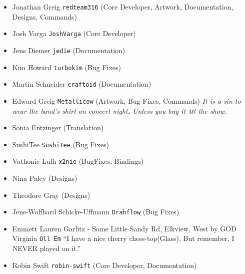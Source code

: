 \begin{itemize}
\item Jonathan Greig \texttt{redteam316} (Core Developer, Artwork, Documentation, Designs, Commands)
\item Josh Varga \texttt{JoshVarga} (Core Developer)
\item Jens Diemer \texttt{jedie} (Documentation)
\item Kim Howard \texttt{turbokim} (Bug Fixes)
\item Martin Schneider \texttt{craftoid} (Documentation)
\item Edward Greig \texttt{Metallicow} (Artwork, Bug Fixes, Commands)
    \emph{It is a sin to wear the band's shirt on concert night, Unless you buy it @t the show.}
\item Sonia Entzinger (Translation)
\item SushiTee \texttt{SushiTee} (Bug Fixes)
\item Vathonie Lufh \texttt{x2nie} (BugFixes, Bindings)
\item Nina Paley (Designs)
\item Theodore Gray (Designs)
\item Jens-Wolfhard Schicke-Uffmann \texttt{Drahflow} (Bug Fixes)
\item Emmett Lauren Garlitz - Some Little Sandy Rd, Elkview, West by GOD Virginia \texttt{Oll Em}
    ``I have a nice cherry chess-top(Glass). But remember, I NEVER played on it.''
\item Robin Swift \texttt{robin-swift} (Core Developer, Documentation)
\end{itemize}
